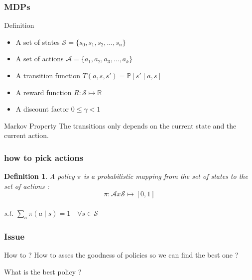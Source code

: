\documentclass[dvipsnames,svgnames]{beamer}
\newtheorem{madef}{Definition}
\begin{document}
\begin{frame}
\frametitle{MDPs}
\begin{block}{Definition }
\begin{itemize}
\item A set of states $\mathcal{S}=\{s_0,s_1,s_2,\ldots,s_{n}\}$
\item A set of actions $\mathcal{A}=\{a_1,a_2,a_3,\ldots,a_{k}\}$
\item A transition function $T(a,s,s') = \mathbb{P}[s'\mid a,s]$
\item A reward function $R: \mathcal{S}\mapsto \mathbb{R}$
\item A discount factor $0 \leq \gamma < 1$ 
\end{itemize}
\end{block}

\begin{block}{Markov Property}
The transitions only depends on the current state and the current action.
\end{block}
\end{frame}

%





\begin{frame}
\frametitle{how to pick actions}
\begin{madef}
A \emph{policy} $\pi$ is a probabilistic mapping from the set of states to the set of actions : 
$$ \pi : \mathcal{A} x \mathcal{S} \mapsto [0,1] $$
\\
s.t. $\underset{a}{\sum } \pi(a\mid s)=1 \quad \forall s \in \mathcal{S}$

\end{madef}
\end{frame}

\begin{frame}
\frametitle{Issue}
\begin{alertblock}{How to ?}
How to asses the goodness of policies so we can find the best one ? 

What is the best policy ?
\end{alertblock}
\end{frame}
\end{document}
